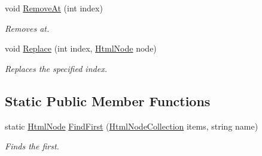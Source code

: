 \begin{DoxyCompactItemize}
void \hyperlink{class_html_agility_pack_1_1_html_node_collection_a727c555fa02ff5573eb375bc7cf657ac}{Remove\+At} (int index)
\begin{DoxyCompactList}\small\item\em Removes at. \end{DoxyCompactList}\item 
void \hyperlink{class_html_agility_pack_1_1_html_node_collection_ae1f50126a6ef764fef65077c61a50539}{Replace} (int index, \hyperlink{class_html_agility_pack_1_1_html_node}{Html\+Node} node)
\begin{DoxyCompactList}\small\item\em Replaces the specified index. \end{DoxyCompactList}\end{DoxyCompactItemize}
\subsection*{Static Public Member Functions}
\begin{DoxyCompactItemize}
\item 
static \hyperlink{class_html_agility_pack_1_1_html_node}{Html\+Node} \hyperlink{class_html_agility_pack_1_1_html_node_collection_a0475c613be6aca340e6794722f15915c}{Find\+First} (\hyperlink{class_html_agility_pack_1_1_html_node_collection}{Html\+Node\+Collection} items, string name)
\begin{DoxyCompactList}\small\item\em Finds the first. \end{DoxyCompactList}\end{DoxyCompactItemize}
